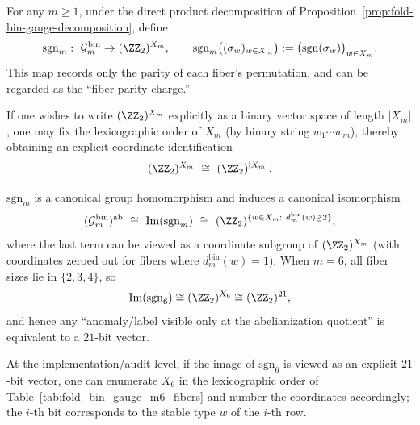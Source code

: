 \begin{definition}\label{def:fold-bin-gauge-sign}
For any \(m\ge 1\), under the direct product decomposition of Proposition~\ref{prop:fold-bin-gauge-decomposition}, define
\[
\mathrm{sgn}_m:\ \mathcal{G}^{\mathrm{bin}}_m\to (\ZZ_2)^{X_m},
\qquad
\mathrm{sgn}_m\bigl((\sigma_w)_{w\in X_m}\bigr):=\bigl(\mathrm{sgn}(\sigma_w)\bigr)_{w\in X_m}.
\]
This map records only the parity of each fiber's permutation, and can be regarded as the ``fiber parity charge.''
\par
If one wishes to write \((\ZZ_2)^{X_m}\) explicitly as a binary vector space of length \(|X_m|\), one may fix the lexicographic order of \(X_m\) (by binary string \(w_1\cdots w_m\)), thereby obtaining an explicit coordinate identification
\[
(\ZZ_2)^{X_m}\ \cong\ (\ZZ_2)^{|X_m|}.
\]
\end{definition}

\begin{corollary}[Canonicity of the fiber parity charge and the \(21\)-bit signature at \texorpdfstring{$m=6$}{m=6}]\label{cor:fold-bin-gauge-sign}
\(\mathrm{sgn}_m\) is a canonical group homomorphism and induces a canonical isomorphism
\[
(\mathcal{G}^{\mathrm{bin}}_m)^{\mathrm{ab}}
\ \cong\
\mathrm{Im}(\mathrm{sgn}_m)
\ \cong\
(\ZZ_2)^{\{w\in X_m:\ d^{\mathrm{bin}}_m(w)\ge 2\}},
\]
where the last term can be viewed as a coordinate subgroup of \((\ZZ_2)^{X_m}\) (with coordinates zeroed out for fibers where \(d^{\mathrm{bin}}_m(w)=1\)).
When \(m=6\), all fiber sizes lie in \(\{2,3,4\}\), so
\[
\mathrm{Im}(\mathrm{sgn}_6)\cong (\ZZ_2)^{X_6}\cong (\ZZ_2)^{21},
\]
and hence any ``anomaly/label visible only at the abelianization quotient'' is equivalent to a \(21\)-bit vector.
\end{corollary}

\begin{remark}[Coordinate ordering of the fiber parity charge at \texorpdfstring{$m=6$}{m=6} (auditable)]\label{rem:fold-bin-gauge-sign-coordinates}
At the implementation/audit level, if the image of \(\mathrm{sgn}_6\) is viewed as an explicit \(21\)-bit vector, one can enumerate \(X_6\) in the lexicographic order of Table~\ref{tab:fold_bin_gauge_m6_fibers} and number the coordinates accordingly; the \(i\)-th bit corresponds to the stable type \(w\) of the \(i\)-th row.

\end{remark}

